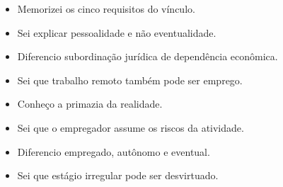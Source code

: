 \documentclass[11pt,a4paper]{article}
\begin{document}
\begin{itemize}
  \item[$\square$] Memorizei os cinco requisitos do vínculo.
  \item[$\square$] Sei explicar pessoalidade e não eventualidade.
  \item[$\square$] Diferencio subordinação jurídica de dependência econômica.
  \item[$\square$] Sei que trabalho remoto também pode ser emprego.
  \item[$\square$] Conheço a primazia da realidade.
  \item[$\square$] Sei que o empregador assume os riscos da atividade.
  \item[$\square$] Diferencio empregado, autônomo e eventual.
  \item[$\square$] Sei que estágio irregular pode ser desvirtuado.
\end{itemize}
\end{document}
